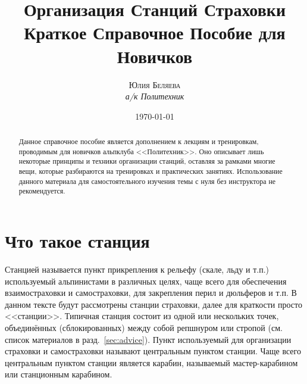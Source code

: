 \documentclass[fleqn, 12pt]{extarticle}
\begin{document}

\title{\textbf{Организация Станций Страховки}\\
\large{Краткое Справочное Пособие для Новичков}}
\author{\textsc{Юлия Беляева}\\\textit{а/к Политехник}}
\date{\today}

\maketitle

\begin{abstract}
	Данное справочное пособие является дополнением к лекциям и тренировкам, проводимым для новичков альпклуба <<Политехник>>. Оно описывает лишь некоторые принципы и техники организации станций,
	оставляя за рамками многие вещи, которые разбираются на тренировках и практических занятиях. Использование данного материала для самостоятельного изучения темы с нуля без инструктора не
	рекомендуется.
\end{abstract}

\section{Что такое станция}
Станцией называется пункт прикрепления к рельефу (скале, льду и т.п.) используемый альпинистами в различных целях, чаще всего для обеспечения взаимостраховки и самостраховки, для
закрепления перил и дюльферов и т.п. В данном тексте будут рассмотрены станции страховки, далее для краткости просто <<станции>>. Типичная станция состоит из одной или нескольких точек,
объединённых (сблокированных) между собой репшнуром или стропой (см. список материалов в разд.~\ref{sec:advice}). Пункт используемый для организации страховки и
самостраховки называют центральным пунктом станции.
Чаще всего центральным пунктом станции является карабин, называемый мастер-карабином или станционным карабином.
\end{document}
